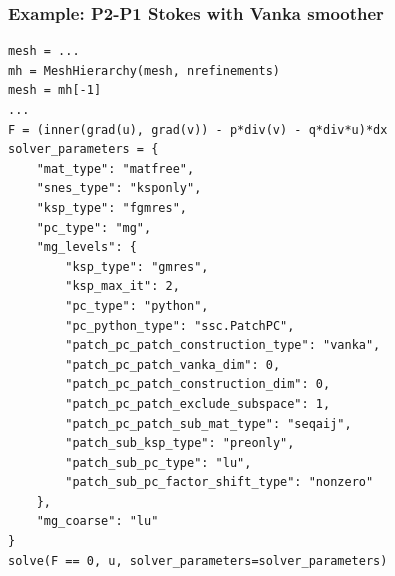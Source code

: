 \documentclass[presentation,aspectratio=43]{beamer}
\begin{document}
\begin{frame}[fragile]
  \frametitle{Example: P2-P1 Stokes with Vanka smoother}
\begin{verbatim}
mesh = ...
mh = MeshHierarchy(mesh, nrefinements)
mesh = mh[-1]
...
F = (inner(grad(u), grad(v)) - p*div(v) - q*div*u)*dx
solver_parameters = {
    "mat_type": "matfree",
    "snes_type": "ksponly",
    "ksp_type": "fgmres",
    "pc_type": "mg",
    "mg_levels": {
        "ksp_type": "gmres",
        "ksp_max_it": 2,
        "pc_type": "python",
        "pc_python_type": "ssc.PatchPC",
        "patch_pc_patch_construction_type": "vanka",
        "patch_pc_patch_vanka_dim": 0,
        "patch_pc_patch_construction_dim": 0,
        "patch_pc_patch_exclude_subspace": 1,
        "patch_pc_patch_sub_mat_type": "seqaij",
        "patch_sub_ksp_type": "preonly",
        "patch_sub_pc_type": "lu",
        "patch_sub_pc_factor_shift_type": "nonzero"
    },
    "mg_coarse": "lu"
}
solve(F == 0, u, solver_parameters=solver_parameters)
\end{verbatim}
\end{frame}
\end{document}
